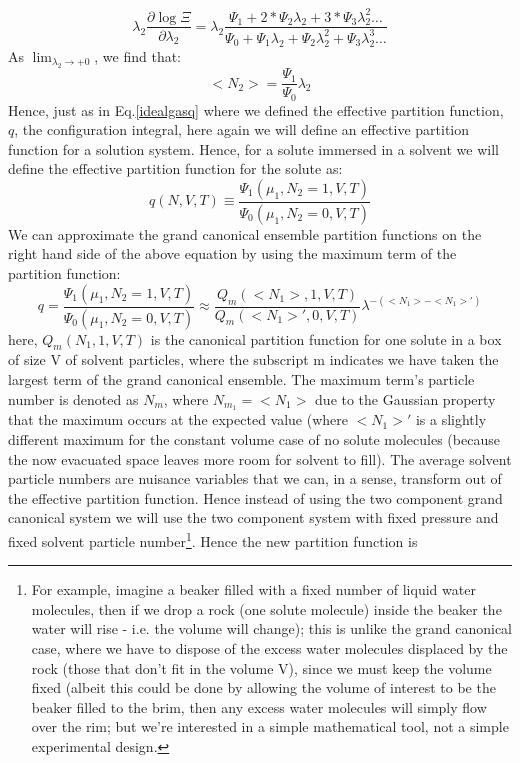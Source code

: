 \begin{equation}\label{}
  \lambda_{2}  \frac{\partial\log \Xi}{\partial \lambda_{2}} = \lambda_{2} \frac{\Psi_1 + 2* \Psi_2 \lambda_{2} +3*\Psi_3 \lambda_{2}^2 \dots  }{\Psi_0 + \Psi_1 \lambda_{2} +  \Psi_2 \lambda_{2}^2 +\Psi_3 \lambda_{2}^3 \dots }
\end{equation}
As $\lim_{\lambda_{2} \to +0}$, we find that:
\begin{equation}\label{averageN}
  < N_2 > = \frac{ \Psi_1}{\Psi_0} \lambda_2
\end{equation}
Hence, just as in Eq.\ref{idealgasq} where we defined the effective partition function, $q$, the configuration integral, here again we will define an effective partition function for a solution system.  Hence, for a solute immersed in a solvent we will define the effective partition function for the solute as:
\begin{equation}\label{qref}
  q(N,V,T) \equiv \frac{ \Psi_1(\mu_1,N_2=1,V,T) }{\Psi_0(\mu_1,N_2=0,V,T)}
\end{equation}
We can approximate the grand canonical ensemble partition functions on the right hand side of the above equation by using the maximum term of the partition function:
\begin{equation}\label{solvent}
  q= \frac{ \Psi_1(\mu_1,N_2=1,V,T) }{\Psi_0(\mu_1,N_2=0,V,T)} \approx \frac{Q_m(<N_1>,1,V,T)}{Q_m(<N_1>',0,V,T)}\lambda^{-(<N_1> - <N_1>')}
\end{equation}
here, $Q_m(N_1,1,V,T)$ is the canonical partition function for one solute in a box of size V of solvent particles, where the subscript m indicates we have taken the largest term of the grand canonical ensemble.  The maximum term's particle number is denoted as $N_{m}$, where $N_{m_1}=<N_1>$ due to the Gaussian property that the maximum occurs at the expected value (where $<N_1>'$ is a slightly different maximum for the constant volume case of no solute molecules (because the now evacuated space leaves more room for solvent to fill).  The average solvent particle numbers are nuisance variables that we can, in a sense, transform out of the effective partition function.  Hence instead of using the two component grand canonical system we will use the two component system with fixed pressure and fixed solvent particle number\footnote{For example, imagine a beaker filled with a fixed number of liquid water molecules, then if we drop a rock (one solute molecule) inside the beaker the water will rise - i.e. the volume will change); this is unlike the grand canonical case, where we have to dispose of the excess water molecules displaced by the rock (those that don't fit in the volume V), since we must keep the volume fixed (albeit this could be done by allowing the volume of interest to be the beaker filled to the brim, then any excess water molecules will simply flow over the rim; but we're interested in a simple mathematical tool, not a simple experimental design.}.  Hence the new partition function is  
